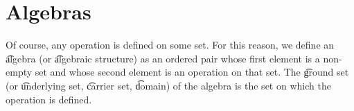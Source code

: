 \section*{Algebras}

Of course, any operation is defined on some set.
For this reason, we define an \t{algebra} (or \t{algebraic structure}) as an ordered pair whose first element is a non-empty set and whose second element is an operation on that set.
The \t{ground set} (or \t{underlying set}, \t{carrier set}, \t{domain}) of the algebra is the set on which the operation is defined.

